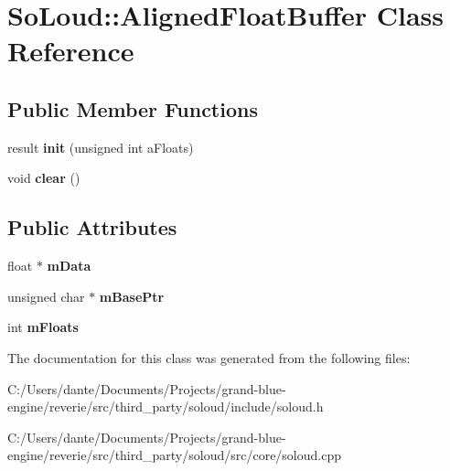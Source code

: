 \hypertarget{class_so_loud_1_1_aligned_float_buffer}{}\section{So\+Loud\+::Aligned\+Float\+Buffer Class Reference}
\label{class_so_loud_1_1_aligned_float_buffer}
\subsection*{Public Member Functions}
\begin{DoxyCompactItemize}
\item 
\mbox{\label{class_so_loud_1_1_aligned_float_buffer_a163449d57904aa8b61afc579e6ef85aa}} 
result {\bfseries init} (unsigned int a\+Floats)
\item 
\mbox{\label{class_so_loud_1_1_aligned_float_buffer_a5e6163b7c700381640f691e18a725531}} 
void {\bfseries clear} ()
\end{DoxyCompactItemize}
\subsection*{Public Attributes}
\begin{DoxyCompactItemize}
\item 
\mbox{\label{class_so_loud_1_1_aligned_float_buffer_a0e9b2b694e1d84c8c93082573be75659}} 
float $\ast$ {\bfseries m\+Data}
\item 
\mbox{\label{class_so_loud_1_1_aligned_float_buffer_a7e39207aaaf50586a6a128cd4fdefe5b}} 
unsigned char $\ast$ {\bfseries m\+Base\+Ptr}
\item 
\mbox{\label{class_so_loud_1_1_aligned_float_buffer_af9764cc3bc3f6fabefaa15e9180c4ab5}} 
int {\bfseries m\+Floats}
\end{DoxyCompactItemize}


The documentation for this class was generated from the following files\+:\begin{DoxyCompactItemize}
\item 
C\+:/\+Users/dante/\+Documents/\+Projects/grand-\/blue-\/engine/reverie/src/third\+\_\+party/soloud/include/soloud.\+h\item 
C\+:/\+Users/dante/\+Documents/\+Projects/grand-\/blue-\/engine/reverie/src/third\+\_\+party/soloud/src/core/soloud.\+cpp\end{DoxyCompactItemize}
